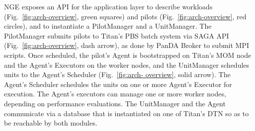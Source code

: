 

NGE exposes an API for the application   layer to
describe workloads (Fig.~\ref{fig:arch-overview}, green squares) and pilots
(Fig.~\ref{fig:arch-overview}, red circles), and to instantiate a PilotManager
and a UnitManager.   The PilotManager submits pilots to Titan's PBS  batch system via SAGA API
(Fig.~\ref{fig:arch-overview}, dash arrow), as done by PanDA Broker to submit
MPI scripts. Once scheduled, the pilot's Agent is bootstrapped on Titan's MOM
node and  the Agent's Executors on the
worker nodes, and the UnitManager schedules units to the Agent's Scheduler
(Fig.~\ref{fig:arch- overview}, solid arrow). The Agent's Scheduler schedules
the units on one or more Agent's Executor for execution. The Agent's executors
can manage one or more worker nodes, depending on performance evaluations. The
UnitManager and the Agent communicate via a database that is instantiated on one
of Titan's DTN so as to be reachable by both modules.



